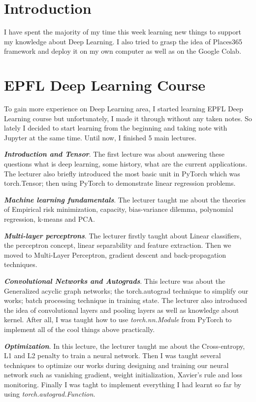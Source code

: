 \section{Introduction}
I have spent the majority of my time this week learning new things to support my knowledge about Deep Learning. I also tried to grasp the idea of Places365 framework and deploy it on my own computer as well as on the Google Colab.

\section{EPFL Deep Learning Course}
To gain more experience on Deep Learning area, I started learning EPFL Deep Learning course\cite{epfl} but unfortunately, I made it through without any taken notes. So lately I decided to start learning from the beginning and taking note with Jupyter at the same time. Until now, I finished 5 main lectures.
	
\textbf{\emph{Introduction and Tensor}}. The first lecture was about answering these questions what is deep learning, some history, what are the current applications. The lecturer also briefly introduced the most basic unit in PyTorch which was torch.Tensor; then using PyTorch to demonstrate linear regression problems.

\textbf{\emph{Machine learning fundamentals}}. The lecturer taught me about the theories of Empirical risk minimization, capacity, bias-variance dilemma, polynomial regression, k-means and PCA.

\textbf{\emph{Multi-layer perceptrons}}. The lecturer firstly taught about Linear classifiers, the perceptron concept, linear separability and feature extraction. Then we moved to Multi-Layer Perceptron, gradient descent and back-propagation techniques.

\textbf{\emph{Convolutional Networks and Autograds}}. This lecture was about the Generalized acyclic graph networks; the torch.autograd technique to simplify our works; batch processing technique in training state. The lecturer also introduced the idea of convolutional layers and pooling layers as well as knowledge about kernel. After all, I was taught how to use \emph{torch.nn.Module} from PyTorch to implement all of the cool things above practically.

	
\textbf{\emph{Optimization}}. In this lecture, the lecturer taught me about the Cross-entropy, L1 and L2 penalty to train a neural network. Then I was taught several techniques to optimize our works during designing and training our neural network such as vanishing gradient, weight initialization, Xavier's rule and loss monitoring. Finally I was taght to implement everything I had learnt so far by using \emph{torch.autograd.Function}.

